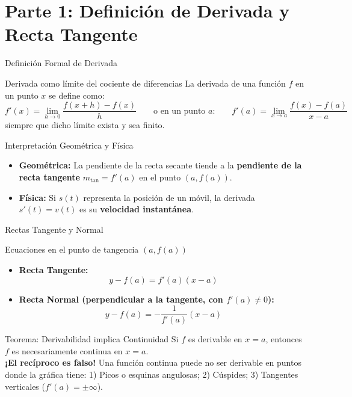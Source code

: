 \documentclass[aspectratio=169]{beamer}
\begin{document}
\begin{frame}[plain]
  \titlepage
\end{frame}

\section{Parte 1: Definición de Derivada y Recta Tangente}


\begin{frame}{Definición Formal de Derivada}
  \begin{block}{Derivada como límite del cociente de diferencias}
    La derivada de una función $f$ en un punto $x$ se define como:
    $$\boxed{f'(x) = \lim_{h \to 0} \frac{f(x + h) - f(x)}{h}} \qquad\text{o en un punto $a$:}\qquad \boxed{f'(a) = \lim_{x \to a} \frac{f(x) - f(a)}{x - a}}$$
    siempre que dicho límite exista y sea finito.
  \end{block}

  \vspace{4pt}
  \begin{block}{Interpretación Geométrica y Física}
    \begin{itemize}
      \item \textbf{Geométrica:} La pendiente de la recta secante tiende a la \textbf{pendiente de la recta tangente} $m_{\text{tan}} = f'(a)$ en el punto $(a, f(a))$.
      \item \textbf{Física:} Si $s(t)$ representa la posición de un móvil, la derivada $s'(t) = v(t)$ es su \textbf{velocidad instantánea}.
    \end{itemize}
  \end{block}
\end{frame}

\begin{frame}{Rectas Tangente y Normal}
  \begin{block}{Ecuaciones en el punto de tangencia $(a, f(a))$}
    \begin{itemize}
      \item \textbf{Recta Tangente:}
            $$\boxed{y - f(a) = f'(a)(x - a)}$$
      \item \textbf{Recta Normal (perpendicular a la tangente, con $f'(a) \neq 0$):}
            $$\boxed{y - f(a) = -\frac{1}{f'(a)}(x - a)}$$
    \end{itemize}
  \end{block}

  \vspace{4pt}
  \begin{alertblock}{Teorema: Derivabilidad implica Continuidad}
    Si $f$ es derivable en $x = a$, entonces $f$ es necesariamente continua en $x = a$. \\
    \textbf{¡El recíproco es falso!} Una función continua puede no ser derivable en puntos donde la gráfica tiene:
    1) Picos o esquinas angulosas; 2) Cúspides; 3) Tangentes verticales ($f'(a) = \pm\infty$).
  \end{alertblock}
\end{frame}
\end{document}
